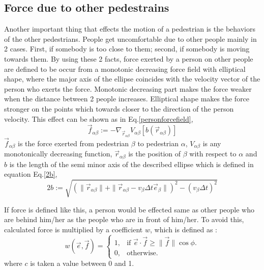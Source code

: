 \documentclass[11pt]{article}
\begin{document}
\subsection{Force due to other pedestrains}
Another important thing that effects the motion of a pedestrian is the behaviors of the other pedestrians. People get uncomfortable due to other people mainly in 2 cases. First, if somebody is too close to them; second, if somebody is moving towards them.
By using these 2 facts, force exerted by a person on other people are defined to be occur from a monotonic decreasing force field with elliptical shape, where the major axis of the ellipse coincides with the velocity vector of the person who exerts the force. Monotonic decreasing part makes the force weaker when the distance between 2 people increases. Elliptical shape makes the force stronger on the points which towards closer to the direction of the person velocity. This effect can be shown as in Eq.\ref{personforcefield},
\begin{equation}
    \vec{f}_{\alpha\beta}:=-\nabla_{\vec{r}_{\alpha\beta}}V_{\alpha\beta}[b(\vec{r}_{\alpha\beta})]
\label{personforcefield}
\end{equation}
$\vec{f}_{\alpha\beta}$ is the force exerted from pedestrian $\beta$ to pedestrian $\alpha$, $V_{\alpha\beta}$ is any monotonically decreasing function, $\vec{r}_{\alpha\beta}$ is the position of $\beta$ with respect to $\alpha$ and $b$ is the length of the semi minor axis of the described ellipse which is defined in equation Eq.\ref{2b},
\begin{equation}
    2b:=\sqrt{(\|\vec{r}_{\alpha\beta}\|+\|\vec{r}_{\alpha\beta}-v_\beta\Delta t\vec{e}_{\beta}\|)^2-(v_\beta\Delta t)^2}
    \label{2b}
\end{equation}

If force is defined like this, a person would be effected same as other people who are behind him/her as the people who are in front of him/her. To avoid this, calculated force is multiplied by a coefficient $w$, which is defined as : 
\begin{equation}
    w(\vec{e},\vec{f})=\begin{cases}
    1, & \text{if $\vec{e}\cdot\vec{f}\geq\|\vec{f}\|\cos{\phi}$}.\\
    0, & \text{otherwise}.
  \end{cases}
\end{equation}
where $c$ is taken a value between 0 and 1.
\end{document}
